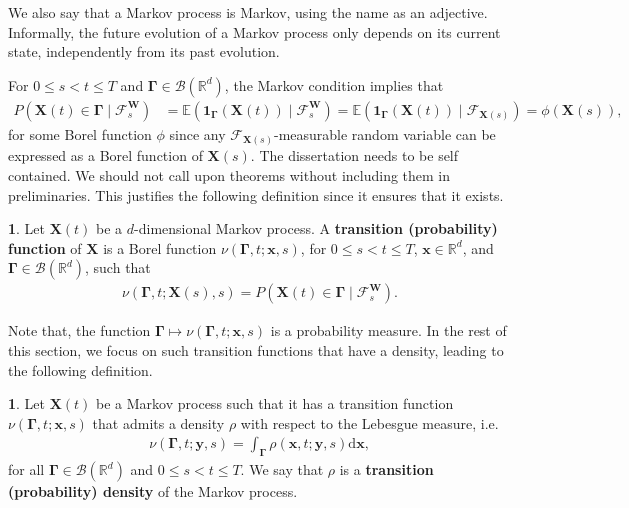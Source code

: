 \documentclass[english]{article}
\newcommand{\comment}[1]{\color{blue}#1\color{black}}
\numberwithin{equation}{section}
\numberwithin{figure}{section}
\theoremstyle{bolddescit}
\theoremstyle{definition}
\newtheorem{definition}[theorem]{\protect\definitionname}
\theoremstyle{definition}
\theoremstyle{plain}
\theoremstyle{plain}
\theoremstyle{bolddesc}
\theoremstyle{plain}
\theoremstyle{remark}
\providecommand{\definitionname}{Definition}
\begin{document}
We also say that a Markov process is Markov, using the name as an adjective. Informally, the future evolution of a Markov process only depends on its current state, independently from its past evolution.

For $0 \le s < t \le T$ and $\mathbf{\Gamma} \in \mathcal{B}({\mathbb{R}^d})$, the Markov condition implies that
\begin{align*}
  P(\mathbf{X}(t) \in \mathbf{\Gamma} \mid \mathcal{F}^\mathbf{W}_s)
  &= \mathbb{E}(\mathbf{1}_\mathbf{\Gamma}(\mathbf{X}(t)) \mid \mathcal{F}^\mathbf{W}_s)
  = \mathbb{E}(\mathbf{1}_\mathbf{\Gamma}(\mathbf{X}(t)) \mid \mathcal{F}_{\mathbf{X}(s)})
  = \phi(\mathbf{X}(s)),
\end{align*}
for some Borel function $\phi$ since any $\mathcal{F}_{\mathbf{X}(s)}$-measurable random variable can be expressed as a Borel function of $\mathbf{X}(s)$.
\comment{The dissertation needs to be self contained. We should not call upon theorems without including them in preliminaries.}
This justifies the following definition since it ensures that it exists.

\begin{definition}
  Let $\mathbf{X}(t)$ be a $d$-dimensional Markov process. A \textbf{transition (probability) function} of $\mathbf{X}$ is a Borel function $\nu(\mathbf{\Gamma}, t; \mathbf{x}, s)$, for $0 \le s < t \le T$, $\mathbf{x} \in \mathbb{R}^d$, and $\mathbf{\Gamma} \in \mathcal{B}(\mathbb{R}^d)$, such that
  \begin{align*}
    \nu(\mathbf{\Gamma}, t; \mathbf{X}(s), s) = P(\mathbf{X}(t) \in \mathbf{\Gamma} \mid \mathcal{F}^\mathbf{W}_s).
  \end{align*}
\end{definition}

Note that, the function $\mathbf{\Gamma} \mapsto \nu(\mathbf{\Gamma}, t; \mathbf{x}, s)$ is a probability measure. In the rest of this section, we focus on such transition functions that have a density, leading to the following definition.

\begin{definition}
  Let $\mathbf{X}(t)$ be a Markov process such that it has a transition function $\nu(\mathbf{\Gamma},t;\mathbf{x},s)$ that admits a density $\rho$ with respect to the Lebesgue measure, i.e.
  \begin{align*}
    \nu(\mathbf{\Gamma},t;\mathbf{y},s) = \int_\mathbf{\Gamma} \rho(\mathbf{x},t;\mathbf{y},s) \mathrm{d}\mathbf{x},
  \end{align*}
  for all $\mathbf{\Gamma} \in \mathcal{B}(\mathbb{R}^d)$ and $0 \le s < t \le T$.
  We say that $\rho$ is a \textbf{transition (probability) density} of the Markov process.
\end{definition}
\end{document}
